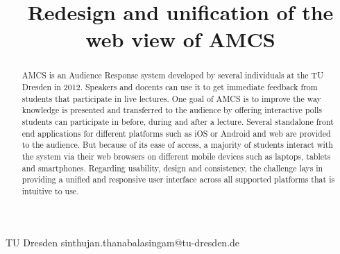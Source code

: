 \documentclass{sigplanconf}
\begin{document}
\setlength{\pdfpageheight}{\paperheight}
\setlength{\pdfpagewidth}{\paperwidth}






\title{Redesign and unification of the web view of AMCS}

           {TU Dresden}
           {sinthujan.thanabalasingam@tu-dresden.de}

\maketitle

\begin{abstract}

AMCS is an Audience Response system developed by several individuals at the TU Dresden in 2012. Speakers and docents can use it to get immediate feedback from students that participate in live lectures. One goal of AMCS is to improve the way knowledge is presented and transferred to the audience by offering interactive polls students can participate in before, during and after a lecture.
Several standalone front end applications for different platforms such as iOS or Android and web are provided to the audience. But because of its ease of access, a majority of students interact with the system via their web browsers on different mobile devices such as laptops, tablets and smartphones. 
Regarding usability, design and consistency, the challenge lays in providing a unified and responsive user interface across all supported platforms that is intuitive to use.
\end{abstract}
\end{document}
